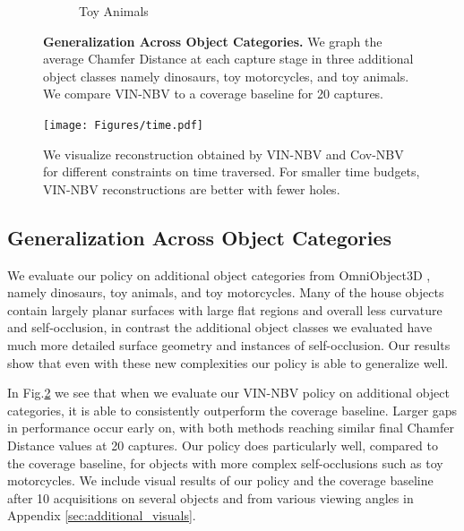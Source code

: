 \begin{figure}[!t]
\begin{subfigure}[t]{0.33\textwidth}
    \caption{Toy Animals}
    \label{fig:animal_chamf}
  \end{subfigure}
  \vspace{-0.5em}
  \caption{
  \textbf{Generalization Across Object Categories.} We graph the average Chamfer Distance at each capture stage in three additional object classes namely dinosaurs, toy motorcycles,
  and toy animals. We compare VIN-NBV to a coverage baseline for 20 captures.
  }
  \label{fig:all_generalization}
\end{figure}

\begin{figure}[!t]
  \centering
  \vspace{0.25em}
\texttt{[image: Figures/time.pdf]}
    \vspace{-1.5em}
  \caption{We visualize reconstruction obtained by VIN-NBV and Cov-NBV for different constraints on time traversed. For smaller time budgets, VIN-NBV reconstructions are better with fewer holes.}
  \label{fig:time_figs}
  \vspace{-1.0em}
\end{figure}

\subsection{Generalization Across Object Categories}
\label{sec:generalization}
\vspace{-0.25em}

We evaluate our policy on additional object categories from OmniObject3D \cite{wu2023omniobject3d}, namely dinosaurs, toy animals, and toy motorcycles. Many of the house objects contain largely planar surfaces with large flat regions and overall less curvature and self-occlusion, in contrast the additional object classes we evaluated have much more detailed surface geometry and instances of self-occlusion. Our results show that even with these new complexities our policy is able to generalize well.

In Fig.\ref{fig:all_generalization} we see that when we evaluate our VIN-NBV policy on additional object categories, it is able to consistently outperform the coverage baseline. Larger gaps in performance occur early on, with both methods reaching similar final Chamfer Distance values at 20 captures. Our policy does particularly well, compared to the coverage baseline, for objects with more complex self-occlusions such as toy motorcycles. We include visual results of our policy and the coverage baseline after 10 acquisitions on several objects and from various viewing angles in Appendix \ref{sec:additional_visuals}.

